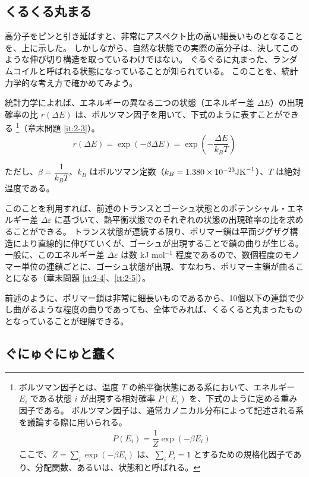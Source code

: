 \documentclass[uplatex,dvipdfmx,a4paper,11pt, titlepage]{jsarticle}
\begin{document}
\subsection{くるくる丸まる}

高分子をピンと引き延ばすと、非常にアスペクト比の高い細長いものとなることを、上に示した。
しかしながら、自然な状態での実際の高分子は、決してこのような伸び切り構造を取っているわけではない。
ぐるぐるに丸まった、ランダムコイルと呼ばれる状態になっていることが知られている。
このことを、統計力学的な考え方で確かめてみよう。

統計力学によれば、エネルギーの異なる二つの状態（エネルギー差 $\Delta E$）の出現確率の比 $r(\Delta E)$ は、ボルツマン因子を用いて、下式のように表すことができる
\footnote
{
ボルツマン因子とは、温度 $T$ の熱平衡状態にある系において、エネルギー $E_i$ である状態 $i$ が出現する相対確率 $P(E_i)$ を、下式のように定める重み因子である。
ボルツマン因子は、通常カノニカル分布によって記述される系を議論する際に用いられる。
\begin{align*}
P(E_i) = \dfrac{1}{Z} \exp(-\beta E_i)
\end{align*}
ここで、$Z=\sum_i \exp(-\beta E_i)$ は、$\sum_i P_i = 1$ とするための規格化因子であり、分配関数、あるいは、状態和と呼ばれる。

}（章末問題 \ref{it:2-3}）。
\begin{equation}
r(\Delta E) = \exp(-\beta \Delta E)=\exp \left( -\dfrac{\Delta E}{k_B T} \right)
\label{eq:ratio}
\end{equation}

ただし、$\beta=\dfrac{1}{k_B T}$、$k_B$ はボルツマン定数（$k_B =1.380 \times 10^{-23} {\rm J K}^{-1}$）、$T$ は絶対温度である。

このことを利用すれば、前述のトランスとゴーシュ状態とのポテンシャル・エネルギー差 $\Delta \varepsilon$ に基づいて、熱平衡状態でのそれぞれの状態の出現確率の比を求めることができる。
トランス状態が連続する限り、ポリマー鎖は平面ジグザグ構造により直線的に伸びていくが、ゴーシュが出現することで鎖の曲りが生じる。
一般に、このエネルギー差 $\Delta \varepsilon$ は数 kJ mol$^{-1}$ 程度であるので、数個程度のモノマー単位の連鎖ごとに、ゴーシュ状態が出現、すなわち、ポリマー主鎖が曲ることになる（章末問題 \ref{it:2-4}、\ref{it:2-5}）。

前述のように、ポリマー鎖は非常に細長いものであるから、10個以下の連鎖で少し曲がるような程度の曲りであっても、全体でみれば、くるくると丸まったものとなっていることが理解できる。

\subsection{ぐにゅぐにゅと蠢く}
\end{document}
